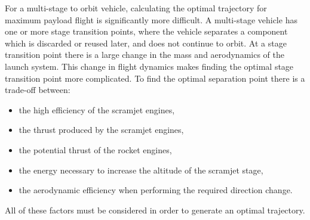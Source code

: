 For a multi-stage to orbit vehicle, calculating the optimal trajectory for maximum payload flight is significantly more difficult. A multi-stage vehicle has one or more stage transition points, where the vehicle separates a component which is discarded or reused later, and does not continue to orbit. At a stage transition point there is a large change in the mass and aerodynamics of the launch system. 
This change in flight dynamics makes finding the optimal stage transition point more complicated. To find the optimal separation point there is a trade-off between:
\begin{itemize}
	\item the high efficiency of the scramjet engines,
	\item the thrust produced by the scramjet engines,
	\item the potential thrust of the rocket engines,
	\item the energy necessary to increase the altitude of the scramjet stage,
	\item the aerodynamic efficiency when performing the required direction change.
\end{itemize}
All of these factors must be considered in order to generate an optimal trajectory. 

